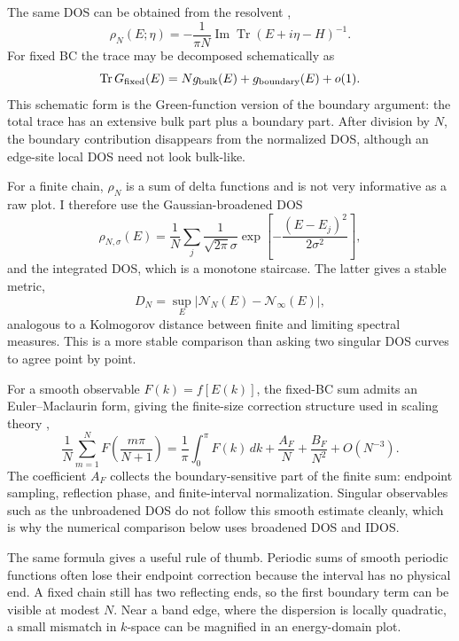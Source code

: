 ﻿\documentclass[a4paper,aps,prb,reprint,floatfix,nofootinbib,longbibliography]{revtex4-2}
\begin{document}
The same DOS can be obtained from the resolvent \cite{Economou},
\begin{equation}
\rho_N(E;\eta)=-\frac{1}{\pi N}
\operatorname{Im}\operatorname{Tr}(E+i\eta-H)^{-1}.
\end{equation}
For fixed BC the trace may be decomposed schematically as
\begin{equation}
\operatorname{Tr}G_{\rm fixed}(E)=
N g_{\rm bulk}(E)+g_{\rm boundary}(E)+o(1).
\end{equation}
This schematic form is the Green-function version of the boundary argument: the total trace has an extensive bulk part plus a boundary part.  After division by \(N\), the boundary contribution disappears from the normalized DOS, although an edge-site local DOS need not look bulk-like.

For a finite chain, \(\rho_N\) is a sum of delta functions and is not very informative as a raw plot.  I therefore use the Gaussian-broadened DOS
\begin{equation}
\rho_{N,\sigma}(E)=\frac{1}{N}\sum_j
\frac{1}{\sqrt{2\pi}\sigma}
\exp\!\left[-\frac{(E-E_j)^2}{2\sigma^2}\right],
\end{equation}
and the integrated DOS, which is a monotone staircase.  The latter gives a stable metric,
\begin{equation}
D_N=\sup_E|\mathcal N_N(E)-\mathcal N_\infty(E)|,
\end{equation}
analogous to a Kolmogorov distance between finite and limiting spectral measures.  This is a more stable comparison than asking two singular DOS curves to agree point by point.

For a smooth observable \(F(k)=f[E(k)]\), the fixed-BC sum admits an Euler--Maclaurin form, giving the finite-size correction structure used in scaling theory \cite{Cardy},
\begin{equation}
\frac{1}{N}\sum_{m=1}^{N}
F\!\left(\frac{m\pi}{N+1}\right)
=
\frac{1}{\pi}\int_0^\pi F(k)\,dk
+\frac{A_F}{N}
+\frac{B_F}{N^2}
+O(N^{-3}).
\end{equation}
The coefficient \(A_F\) collects the boundary-sensitive part of the finite sum: endpoint sampling, reflection phase, and finite-interval normalization.  Singular observables such as the unbroadened DOS do not follow this smooth estimate cleanly, which is why the numerical comparison below uses broadened DOS and IDOS.

The same formula gives a useful rule of thumb.  Periodic sums of smooth periodic functions often lose their endpoint correction because the interval has no physical end.  A fixed chain still has two reflecting ends, so the first boundary term can be visible at modest \(N\).  Near a band edge, where the dispersion is locally quadratic, a small mismatch in \(k\)-space can be magnified in an energy-domain plot.
\end{document}

